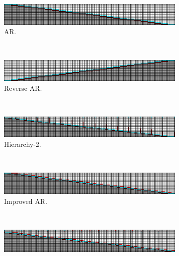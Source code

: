 \begin{figure}[t!]
    \centering
    \begin{subfigure}[t]{\textwidth}
        \centering
        \includegraphics[width=\textwidth]{figures/big-sampling-scheme-visualizations/autoreg.png}
        \caption{AR.}
        \label{fig:ar-app}
    \end{subfigure}
    ~
    \begin{subfigure}[t]{\textwidth}
        \centering
        \includegraphics[width=\textwidth]{figures/big-sampling-scheme-visualizations/reverse-autoreg.png}
        \caption{Reverse AR.}
        \label{fig:reverse-ar-app}
    \end{subfigure}
    ~
    \begin{subfigure}[t]{\textwidth}
        \centering
        \includegraphics[width=\textwidth]{figures/big-sampling-scheme-visualizations/hierarchy-2.png}
        \caption{Hierarchy-2.}
        \label{fig:h2-app}
    \end{subfigure}
    ~
    \begin{subfigure}[t]{\textwidth}
        \centering
        \includegraphics[width=\textwidth]{figures/big-sampling-scheme-visualizations/autoregressive-with-near-future.png}
        \caption{Improved AR.}
        \label{fig:improved-ar-app}
    \end{subfigure}
    ~
    \begin{subfigure}[t]{\textwidth}
        \centering
        \includegraphics[width=\textwidth]{figures/big-sampling-scheme-visualizations/autoregressive-multires-10-1.png}

\end{subfigure}
\end{figure}
